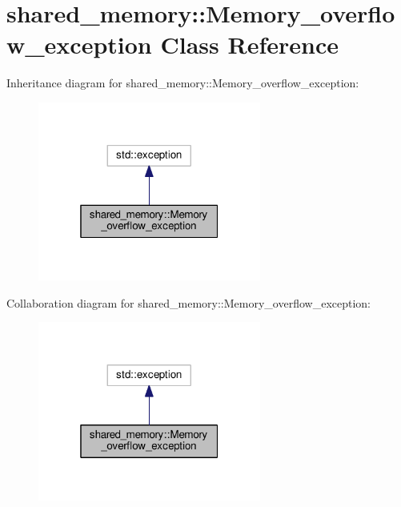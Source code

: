 \hypertarget{classshared__memory_1_1Memory__overflow__exception}{}\section{shared\+\_\+memory\+:\+:Memory\+\_\+overflow\+\_\+exception Class Reference}
\label{classshared__memory_1_1Memory__overflow__exception}


Inheritance diagram for shared\+\_\+memory\+:\+:Memory\+\_\+overflow\+\_\+exception\+:
\nopagebreak
\begin{figure}[H]
\begin{center}
\leavevmode
\includegraphics[width=208pt]{classshared__memory_1_1Memory__overflow__exception__inherit__graph}
\end{center}
\end{figure}


Collaboration diagram for shared\+\_\+memory\+:\+:Memory\+\_\+overflow\+\_\+exception\+:
\nopagebreak
\begin{figure}[H]
\begin{center}
\leavevmode
\includegraphics[width=208pt]{classshared__memory_1_1Memory__overflow__exception__coll__graph}
\end{center}
\end{figure}
